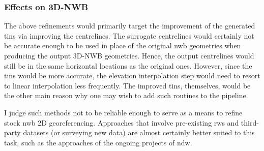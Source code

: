 \subsubsection{Effects on 3D-NWB}

The above refinements would primarily target the improvement of the generated \ac{tin}s via improving the centrelines. The surrogate centrelines would certainly not be accurate enough to be used in place of the original \ac{nwb} geometries when producing the output 3D-NWB geometries. Hence, the output centrelines would still be in the same horizontal locations as the original ones. However, since the \ac{tin}s would be more accurate, the elevation interpolation step would need to resort to linear interpolation less frequently. The improved \ac{tin}s, themselves, would be the other main reason why one may wish to add such routines to the pipeline.

I judge such methods not to be reliable enough to serve as a means to refine stock \ac{nwb} 2D georeferencing. Approaches that involve pre-existing \ac{rws} and third-party datasets (or surveying new data) are almost certainly better suited to this task, such as the approaches of the ongoing projects of \ac{ndw}.